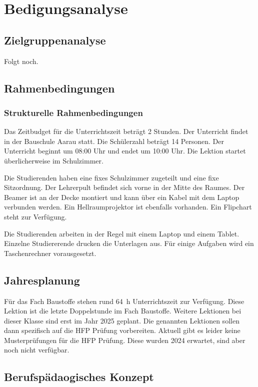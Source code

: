 \documentclass[
11pt,
captions=tableheading,
headsepline,
footsepline, 
captions=tableheading,
parskip=half-,
]{scrartcl}
\begin{document}
\clearpage

\section{Bedigungsanalyse}

\subsection{Zielgruppenanalyse}
Folgt noch.

\subsection{Rahmenbedingungen}
\subsubsection{Strukturelle Rahmenbedingungen}
Das Zeitbudget für die Unterrichtszeit beträgt 2 Stunden. Der Unterricht findet in der Bauschule Aarau statt. Die Schülerzahl beträgt 14 Personen. Der Unterricht beginnt um 08:00 Uhr und endet um 10:00 Uhr.
Die Lektion startet überlicherweise im Schulzimmer.

Die Studierenden haben eine fixes Schulzimmer zugeteilt und eine fixe Sitzordnung. Der Lehrerpult befindet sich vorne in der Mitte des Raumes. Der Beamer ist an der Decke montiert und kann über ein Kabel mit dem Laptop verbunden werden. Ein Hellraumprojektor ist ebenfalls vorhanden. Ein Flipchart steht zur Verfügung.


Die Studierenden arbeiten in der Regel mit einem Laptop und einem Tablet. Einzelne Studiererende drucken die Unterlagen aus. 
Für einige Aufgaben wird ein Taschenrechner vorausgesetzt.

\subsection{Jahresplanung}
Für das Fach Baustoffe stehen rund \SI{64}{\hour} Unterrichtszeit zur Verfügung.
Diese Lektion ist die letzte Doppelstunde im Fach Baustoffe. 
Weitere Lektionen bei dieser Klasse sind erst im Jahr 2025 geplant. 
Die genannten Lektionen sollen dann spezifisch auf die HFP Prüfung vorbereiten. Aktuell gibt es leider keine Musterprüfungen für die HFP Prüfung. Diese wurden 2024 erwartet, sind aber noch nicht verfügbar.

\subsection{Berufspädaogisches Konzept}
\end{document}
